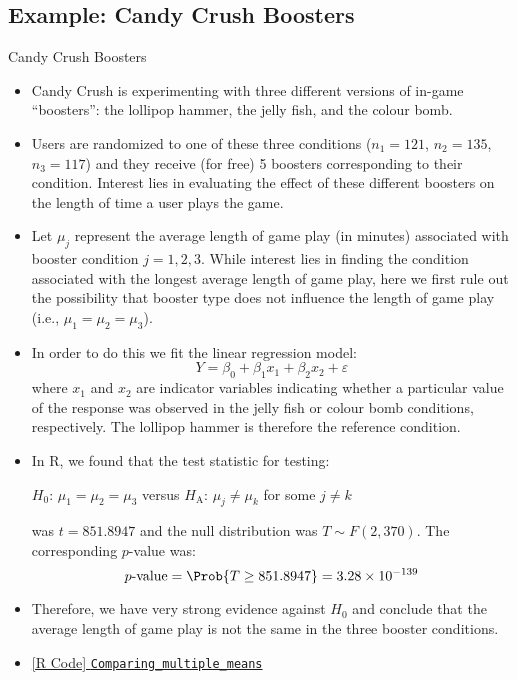 \subsection{Example: Candy Crush Boosters}
\begin{Example}{Candy Crush Boosters}{}
      \begin{itemize}
            \item Candy Crush is experimenting with three different versions of
                  in-game ``boosters'': the lollipop hammer, the jelly fish, and the colour bomb.
            \item Users are randomized to one of these three conditions ($ n_1 = 121 $,
                  $ n_2 = 135 $, $ n_3 = 117$) and they
                  receive (for free) 5
                  boosters corresponding to their condition.
                  Interest lies in evaluating the effect
                  of these different boosters on the length of time a user plays the game.
            \item Let $ \mu_j $ represent the average length of game play
                  (in minutes) associated with booster condition
                  $ j = 1, 2, 3 $. While interest lies in finding the condition
                  associated with the longest average length
                  of game play, here we first rule out the possibility
                  that booster type does not influence the length
                  of game play (i.e., $ \mu_1=\mu_2=\mu_3 $).
            \item In order to do this we fit the linear regression model:
                  \[ Y=\beta_0+\beta_1 x_1+\beta_2 x_2+\varepsilon \]
                  where $ x_1 $ and $ x_2 $ are indicator variables indicating
                  whether a particular value of the response was observed in the
                  jelly fish or colour bomb conditions, respectively.
                  The lollipop hammer is therefore the reference condition.
            \item In R, we found that the test statistic for testing:

                  \centerline{$ H_0 $: $ \mu_1=\mu_2=\mu_3 $ versus $ H_\text{A} $: $ \mu_j\ne \mu_k $
                        for some $ j\ne k $}
                  was $ t=851.8947 $ and the null distribution was $ T \sim F(2,370) $. The corresponding
                  $ p $-value was:
                  \[ p\text{-value}=\Prob{T\ge 851.8947}=3.28\times 10^{-139} \]
            \item Therefore, we have very strong evidence against $ H_0 $ and conclude that the average
                  length of game play is not the same in the three booster conditions.
            \item \href{https://github.com/Hextical/university-notes/blob/master/year-3/semester-3/STAT 430/code/Comparing_multiple_means.R}{[R Code] \texttt{Comparing\_multiple\_means}}
      \end{itemize}
\end{Example}
